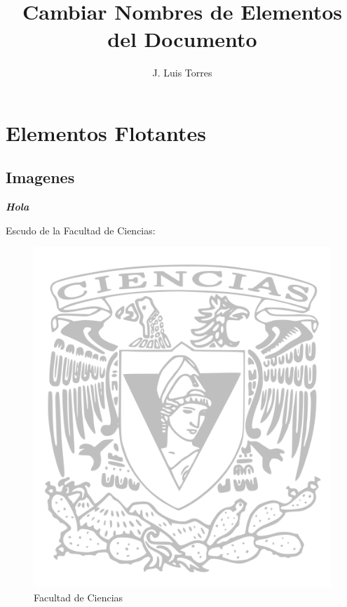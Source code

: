 \documentclass[letterpaper,12pt,twoside]{book}
\title{Cambiar Nombres de Elementos del Documento}
\author{J. Luis Torres}
\newcommand{\hola}{\textit{\textbf{\Huge{Hola}}}}
\begin{document}
\renewcommand{\contentsname}{Lista de Temas}
\renewcommand{\partname}{Bloque}
\renewcommand{\chaptername}{Tema}
\renewcommand{\appendixname}{Complemento}
\renewcommand{\figurename}{Imagen}
\renewcommand{\listfigurename}{Lista de Imagenes}
\renewcommand{\tablename}{Cuadro}
\renewcommand{\listtablename}{Lista de Cuadros}
\renewcommand{\bibname}{Libros}

\maketitle
\thispagestyle{empty}

\frontmatter
\setcounter{page}{1}

\tableofcontents

\listoffigures
{}

\listoftables
{}

\mainmatter

\part{Elementos Flotantes}

\chapter{Imagenes}

\hola

Escudo de la Facultad de Ciencias:

\begin{figure}[h!]
\centering
\includegraphics[scale=0.5]{escudoCiencias}
\caption{Facultad de Ciencias}
\end{figure}
\end{document}
